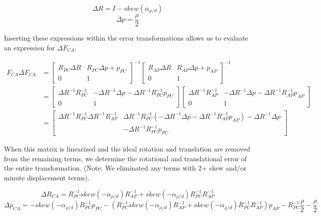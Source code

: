 \documentclass[letterpaper, 11pt]{article}
\begin{document}
$$\Delta R = I - skew(\alpha_{\rho/d})$$
$$\Delta p = \frac{\rho}{2}$$

Inserting these expressions within the error transformations allows us to evaluate an expression for $\Delta F_{CA}$.

\begin{align*}
	F_{CA}\Delta F_{CA} &= \begin{bmatrix}
    						R_{PC}\Delta R & R_{PC}\Delta p + p_{PC} \\
                            0 & 1
                          \end{bmatrix}^{-1} 
                          \begin{bmatrix}
                          	R_{AP}\Delta R & R_{AP}\Delta p + p_{AP}\\
                            0 & 1
                          \end{bmatrix}^{-1}\\
   &= \begin{bmatrix}
       \Delta R^{-1}R_{PC}^{-1} & - \Delta R^{-1}\Delta p -\Delta R^{-1}R_{PC}^{-1}p_{PC}\\
       0 & 1
       \end{bmatrix}
       \begin{bmatrix}
      \Delta R^{-1}R_{AP}^{-1} & -\Delta R^{-1}\Delta p -\Delta R^{-1}R_{AP}^{-1}p_{AP}\\
       0 & 1
       \end{bmatrix} \\
 &= \begin{bmatrix}
 		\Delta R^{-1}R_{PC}^{-1}\Delta R^{-1}R_{AP}^{-1} & \Delta R^{-1}R_{PC}^{-1}(-\Delta R^{-1}\Delta p -\Delta R^{-1}R_{AP}^{-1}p_{AP}) -\Delta R^{-1}\Delta p \\ 
        &-\Delta R^{-1}R_{PC}^{-1}p_{PC}
    \end{bmatrix}
\end{align*}

When this matrix is linearized and the ideal rotation and translation are removed from the remaining terms, we determine the rotational and translational error of the entire transformation. (Note: We eliminated any terms with 2+ skew and/or minute displacement terms).

$$\Delta R_{CA} = R_{PC}^{-1}skew(-\alpha_{\rho/d})R_{AP}^{-1} + skew(-\alpha_{\rho/d})R_{PC}^{-1}R_{AP}^{-1}$$
$$\Delta p_{CA} = -skew(-\alpha_{\rho/d})R_{PC}^{-1}p_{PC} - (R_{PC}^{-1}skew(-\alpha_{\rho/d})R_{AP}^{-1} + skew(-\alpha_{\rho/d})R_{PC}^{-1}R_{AP}^{-1})p_{AP} - R_{PC}^{-1}\frac{\rho}{2} - \frac{\rho}{2}$$
\end{document}
